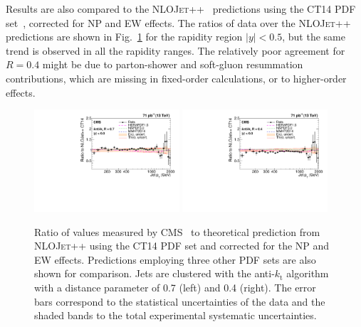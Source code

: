 \documentclass{PoS}
\providecommand{\NLOJETPP} {{\textsc{NLOJet++}}\xspace}
\providecommand{\kts}{\ensuremath{k_{\mathrm{t}}}\xspace}
\begin{document}
Results are also compared to the \NLOJETPP~\cite{Nagy:2003tz} predictions using the CT14 PDF set~\cite{Dulat:2015mca}, corrected for NP and EW effects.
The ratios of data over the \NLOJETPP predictions are shown in Fig.~\ref{fig:ratio_CT14} for the rapidity region
$|y|<0.5$, but the same trend is observed in all the rapidity ranges. The relatively poor agreement for $R = 0.4$ might
be due to parton-shower and soft-gluon resummation contributions, which are missing in fixed-order calculations, or to
higher-order effects. 
\begin{figure}[htbp]
  \includegraphics[width=0.48\textwidth]{Figure2-a.pdf}
  \includegraphics[width=0.48\textwidth]{Figure2-b.pdf}
  \caption{Ratio of values measured by CMS~\cite{Khachatryan:2016wdh} to theoretical prediction from \NLOJETPP using the CT14 PDF set and corrected for
the NP and EW effects. Predictions employing three other PDF sets are also shown for comparison. Jets are
clustered with the anti-\kts algorithm with a distance parameter of
0.7 (left) and 0.4 (right). The error bars correspond to the statistical
uncertainties of the data and the shaded bands to the total experimental systematic uncertainties.}
  \label{fig:ratio_CT14}
\end{figure}
\end{document}
